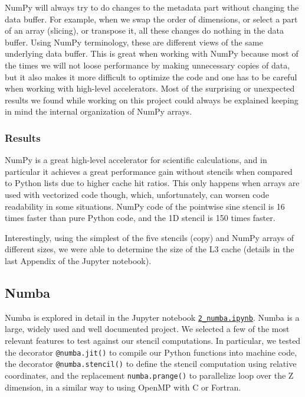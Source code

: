 \documentclass[12pt]{article}
\begin{document}
NumPy will always try to do changes to the metadata part without changing the data buffer. For example, when we swap the order of dimensions, or select a part of an array (slicing), or transpose it, all these changes do nothing in the data buffer. Using NumPy terminology, these are different views of the same underlying data buffer. This is great when working with NumPy because most of the times we will not loose performance by making unnecessary copies of data, but it also makes it more difficult to optimize the code and one has to be careful when working with high-level accelerators. Most of the surprising or unexpected results we found while working on this project could always be explained keeping in mind the internal organization of NumPy arrays.

\subsubsection{Results}

NumPy is a great high-level accelerator for scientific calculations, and in particular it achieves a great performance gain without stencils when compared to Python lists due to higher cache hit ratios. This only happens when arrays are used with vectorized code though, which, unfortunately, can worsen code readability in some situations. NumPy code of the pointwise sine stencil is 16 times faster than pure Python code, and the 1D stencil is 150 times faster.

Interestingly, using the simplest of the five stencils (copy) and NumPy arrays of different sizes, we were able to determine the size of the L3 cache (details in the last Appendix of the Jupyter notebook).


\subsection{Numba}

Numba is explored in detail in the Jupyter notebook \href{run:./2_numba.ipynb}{\texttt{2\_numba.ipynb}}. Numba is a large, widely used and well documented project. We selected a few of the most relevant features to test against our stencil computations. In particular, we tested the decorator \texttt{@numba.jit()} to compile our Python functions into machine code, the decorator \texttt{@numba.stencil()} to define the stencil computation using relative coordinates, and the replacement \texttt{numba.prange()} to parallelize loop over the Z dimension, in a similar way to using OpenMP with C or Fortran.
\end{document}

